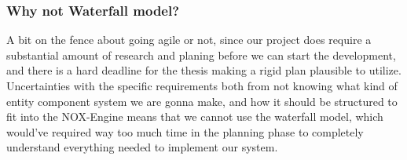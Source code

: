 \subsubsection*{Why not Waterfall model?}

A bit on the fence about going agile or not, since our project does require a substantial amount of research and planing before we can start the development, and there is a hard deadline for the thesis making a rigid plan plausible to utilize. 
Uncertainties with the specific requirements both from not knowing what kind of entity component system we are gonna make, and how it should be structured to fit into the NOX-Engine means that we cannot use the waterfall model, which would've required way too much time in the planning phase to completely understand everything needed to implement our system.